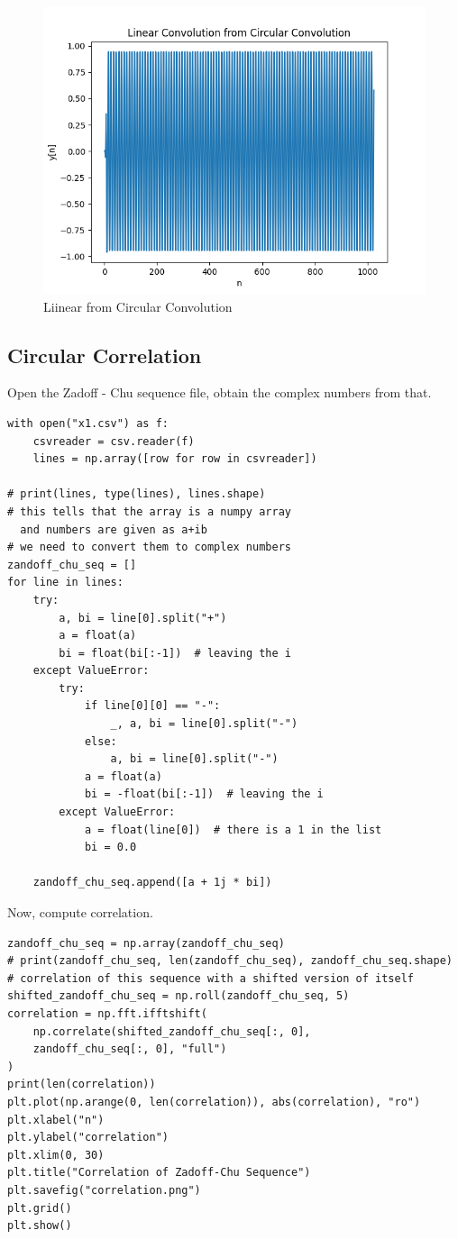 \documentclass[11pt, a4paper]{article}
\begin{document}
\begin{figure}[!tbh]
   	\centering
  \includegraphics[scale=0.5]{lin_from_cir.png} 
    \caption{Liinear from Circular Convolution} 	
   \end{figure}  
   
\subsection{Circular Correlation}
Open the Zadoff - Chu sequence file, obtain the complex numbers from that. 
\begin{verbatim}
with open("x1.csv") as f:
    csvreader = csv.reader(f)
    lines = np.array([row for row in csvreader])

# print(lines, type(lines), lines.shape)
# this tells that the array is a numpy array 
  and numbers are given as a+ib
# we need to convert them to complex numbers
zandoff_chu_seq = []
for line in lines:
    try:
        a, bi = line[0].split("+")
        a = float(a)
        bi = float(bi[:-1])  # leaving the i
    except ValueError:
        try:
            if line[0][0] == "-":
                _, a, bi = line[0].split("-")
            else:
                a, bi = line[0].split("-")
            a = float(a)
            bi = -float(bi[:-1])  # leaving the i
        except ValueError:
            a = float(line[0])  # there is a 1 in the list
            bi = 0.0

    zandoff_chu_seq.append([a + 1j * bi])

\end{verbatim}


Now, compute correlation. 
\begin{verbatim}
zandoff_chu_seq = np.array(zandoff_chu_seq)
# print(zandoff_chu_seq, len(zandoff_chu_seq), zandoff_chu_seq.shape)
# correlation of this sequence with a shifted version of itself
shifted_zandoff_chu_seq = np.roll(zandoff_chu_seq, 5)
correlation = np.fft.ifftshift(
    np.correlate(shifted_zandoff_chu_seq[:, 0], 
    zandoff_chu_seq[:, 0], "full")
)
print(len(correlation))
plt.plot(np.arange(0, len(correlation)), abs(correlation), "ro")
plt.xlabel("n")
plt.ylabel("correlation")
plt.xlim(0, 30)
plt.title("Correlation of Zadoff-Chu Sequence")
plt.savefig("correlation.png")
plt.grid()
plt.show()
\end{verbatim}
\end{document}
